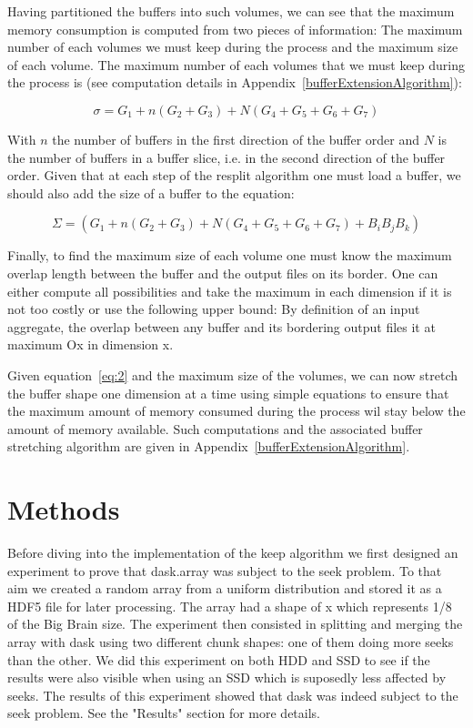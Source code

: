 \documentclass[conference]{IEEEtran}
\begin{document}
Having partitioned the buffers into such volumes, we can see that the maximum
memory consumption is computed from two pieces of information: The maximum number
of each volumes we must keep during the process and the maximum size of each
volume. The maximum number of each volumes that we must keep during the process
is (see computation details in Appendix~\ref{bufferExtensionAlgorithm}):

\begin{equation} \label{eq:1}
\sigma = G_1 + n(G_2 + G_3) + N(G_4 + G_5 + G_6 + G_7)
\end{equation}

With $n$ the number of buffers in the first direction of the buffer order and
$N$ is the number of buffers in a buffer slice, i.e. in the second direction of
the buffer order. Given that at each step of the resplit algorithm one must
load a buffer, we should also add the size of a buffer to the equation:

\begin{equation} \label{eq:2}
\Sigma = (G_1 + n(G_2 + G_3) + N(G_4 + G_5 + G_6 + G_7) + B_iB_jB_k)
\end{equation}

Finally, to find the maximum size of each volume one must know the maximum
overlap length between the buffer and the output files on its border. One can
either compute all possibilities and take the maximum in each dimension if it is
not too costly or use the following upper bound: By definition of an input
aggregate, the overlap between any buffer and its bordering output files it at
maximum Ox in dimension x.

Given equation~\ref{eq:2} and the maximum size of the volumes, we can now
stretch the buffer shape one dimension at a time using simple equations to ensure
that the maximum amount of memory consumed during the process wil stay below the
amount of memory available. Such computations and the associated buffer stretching
algorithm are given in Appendix~\ref{bufferExtensionAlgorithm}.

\section{Methods}

Before diving into the implementation of the keep algorithm we first designed
an experiment to prove that dask.array was subject to the seek problem. To that
aim we created a random array from a uniform distribution and stored it as a
HDF5 file for later processing. The array had a shape of x which represents 1/8
of the Big Brain size. The experiment then consisted in splitting and merging
the array with dask using two different chunk shapes: one of them doing more
seeks than the other. We did this experiment on both HDD and SSD to see if the
results were also visible when using an SSD which is suposedly less affected by
seeks. The results of this experiment showed that dask was indeed subject to the
seek problem. See the "Results" section for more details.
\end{document}
